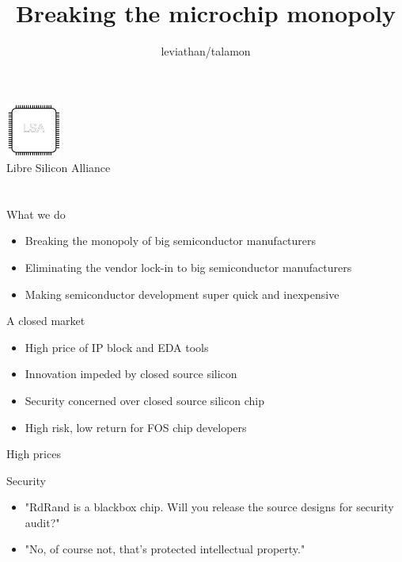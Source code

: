 \documentclass[9pt]{beamer}
\author{leviathan/talamon}
\title{Breaking the microchip monopoly}
\begin{document}
\begin{frame}
	\titlepage
	\begin{center}
		\includegraphics[width=50pt,height=50pt]{lsa.png}
		\\ Libre Silicon Alliance
	\end{center}
\end{frame}


\section[What]{}
\begin{frame}{What we do}
	\begin{itemize}
        \setlength\itemsep{1em}
		\item Breaking the monopoly of big semiconductor manufacturers
		\item Eliminating the vendor lock-in to big semiconductor manufacturers
		\item Making semiconductor development super quick and inexpensive
	\end{itemize}
\end{frame}

\begin{frame}{A closed market}
	\begin{itemize}
        \setlength\itemsep{1em}
		\item High price of IP block and EDA tools
		\item Innovation impeded by closed source silicon
		\item Security concerned over closed source silicon chip
		\item High risk, low return for FOS chip developers
	\end{itemize}
\end{frame}

\begin{frame}{High prices}

\end{frame}

\begin{frame}{Security}
	\begin{itemize}
        \setlength\itemsep{1em}
        \item "RdRand is a blackbox chip. Will you release the source designs for security audit?"
        \item "No, of course not, that's protected intellectual property."
	\end{itemize}    
\end{frame}
\end{document}
